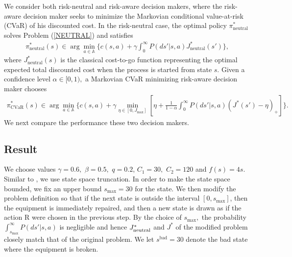 \documentclass[12pt,technote,onecolumn]{IEEEtran}
\begin{document}
We consider both risk-neutral and risk-aware decision makers, where
the risk-aware decision maker seeks to minimize the Markovian conditional
value-at-risk (CVaR) of his discounted cost. In the risk-neutral case,
the optimal policy $\pi_{\text{neutral}}^{*}$ solves Problem (\ref{NEUTRAL})
and satisfies
\begin{equation*}
\begin{aligned}
\pi_{\text{neutral}}^{*}\left(s\right)\in\arg\min_{a\in\mathbb{A}}\bigg\{c(s,a)
+\gamma\int_{0}^{\infty}P\left(ds'|s,a\right)J_{\text{neutral}}^{*}\left(s'\right)\bigg\} ,
\end{aligned}
\end{equation*}
where $J_{\text{neutral}}^{*}\left(s\right)$ is the classical cost-to-go
function representing the optimal expected total discounted cost when
the process is started from state $s.$ Given a confidence level $\alpha\in[0,1),$
a Markovian CVaR minimizing risk-aware decision maker chooses
\begin{equation*}
\begin{aligned}
\pi_{\text{CVaR}}^{*}\left(s\right)\in\arg\min_{a\in\mathbb{A}}\bigg\{c(s,a)
+\gamma\min_{\eta\in\left[0,J_{\max}\right]}[\eta
+\frac{1}{1-\alpha}\int_{0}^{\infty}P\left(ds'|s,a\right)\left(J^{*}\left(s'\right)-\eta\right)_{+}]\bigg\} .
\end{aligned}
\end{equation*}
We next compare the performance these two decision makers.

\subsection{Result}

We choose values $\gamma=0.6,$ $\beta=0.5,$ $q=0.2$, $C_{1}=30,$
$C_{2}=120$ and $f\left(s\right)=4s.$ Similar to \cite{munos2008finite},
we use state space truncation. In order to make the state space bounded,
we fix an upper bound $s_{\max}=30$ for the state. We then modify
the problem definition so that if the next state is outside the interval
$\left[0,s_{\max}\right]$, then the equipment is immediately repaired,
and then a new state is drawn as if the action $\text{R}$ were chosen in
the previous step. By the choice of $s_{\max},$ the probability $\int_{s_{\max}}^{\infty}P\left(ds'|s,a\right)$
is negligible and hence $J_{\text{\text{neutral}}}^{*}$ and $J^{*}$ of the modified
problem closely match that of the original problem. We let $s^{\text{bad}}=30$
denote the bad state where the equipment is broken.
\end{document}
